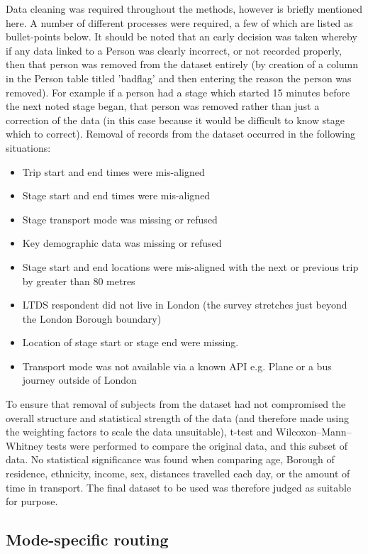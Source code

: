 Data cleaning was required throughout the methods, however is briefly mentioned here. A number of different processes were required, a few of which are listed as bullet-points below. It should be noted that an early decision was taken whereby if any data linked to a Person was clearly incorrect, or not recorded properly, then that person was removed from the dataset entirely (by creation of a column in the Person table titled 'badflag' and then entering the reason the person was removed). For example if a person had a stage which started 15 minutes before the next noted stage began, that person was removed rather than just a correction of the data (in this case because it would be difficult to know stage which to correct). Removal of records from the dataset occurred in the following situations:

\begin{itemize}
\item Trip start and end times were mis-aligned
\item Stage start and end times were mis-aligned
\item Stage transport mode was missing or refused
\item Key demographic data was missing or refused
\item Stage start and end locations were mis-aligned with the next or previous trip by greater than 80 metres
\item LTDS respondent did not live in London (the survey stretches just beyond the London Borough boundary)
\item Location of stage start or stage end were missing.
\item Transport mode was not available via a known API e.g. Plane or a bus journey outside of London
\end{itemize}

To ensure that removal of subjects from the dataset had not compromised the overall structure and statistical strength of the data (and therefore made using the weighting factors to scale the data unsuitable), t-test and Wilcoxon–Mann–Whitney tests were performed to compare the original data, and this subset of data. No statistical significance was found when comparing age, Borough of residence, ethnicity, income, sex, distances travelled each day, or the amount of time in transport. The final dataset to be used was therefore judged as suitable for purpose.

\subsection{Mode-specific routing}
\label{sec:reconstruction_mode_routing}

